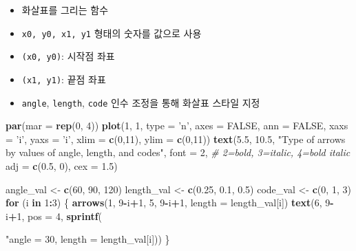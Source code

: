 \documentclass[
  11pt,
]{krantz}
\newenvironment{Shaded}{\begin{snugshade}}{\end{snugshade}}
\newcommand{\CommentTok}[1]{\textcolor[rgb]{0.37,0.37,0.37}{\textit{#1}}}
\newcommand{\ControlFlowTok}[1]{\textcolor[rgb]{0.27,0.27,0.27}{\textbf{#1}}}
\newcommand{\DataTypeTok}[1]{\textcolor[rgb]{0.27,0.27,0.27}{#1}}
\newcommand{\DecValTok}[1]{\textcolor[rgb]{0.06,0.06,0.06}{#1}}
\newcommand{\FloatTok}[1]{\textcolor[rgb]{0.06,0.06,0.06}{#1}}
\newcommand{\KeywordTok}[1]{\textcolor[rgb]{0.27,0.27,0.27}{\textbf{#1}}}
\newcommand{\NormalTok}[1]{#1}
\newcommand{\OperatorTok}[1]{\textcolor[rgb]{0.43,0.43,0.43}{\textbf{#1}}}
\newcommand{\OtherTok}[1]{\textcolor[rgb]{0.37,0.37,0.37}{#1}}
\newcommand{\StringTok}[1]{\textcolor[rgb]{0.5,0.5,0.5}{#1}}
\providecommand{\tightlist}{%
  \setlength{\itemsep}{0pt}\setlength{\parskip}{0pt}}
\begin{document}
\begin{itemize}
\tightlist
\item
  화살표를 그리는 함수
\item
  \texttt{x0,\ y0,\ x1,\ y1} 형태의 숫자를 값으로 사용
\item
  \texttt{(x0,\ y0)}: 시작점 좌표
\item
  \texttt{(x1,\ y1)}: 끝점 좌표
\item
  \texttt{angle}, \texttt{length}, \texttt{code} 인수 조정을 통해 화살표 스타일 지정
\end{itemize}

\footnotesize

\begin{Shaded}
\begin{Highlighting}[]
\KeywordTok{par}\NormalTok{(}\DataTypeTok{mar =} \KeywordTok{rep}\NormalTok{(}\DecValTok{0}\NormalTok{, }\DecValTok{4}\NormalTok{))}
\KeywordTok{plot}\NormalTok{(}\DecValTok{1}\NormalTok{, }\DecValTok{1}\NormalTok{,}
     \DataTypeTok{type =} \StringTok{'n'}\NormalTok{, }\DataTypeTok{axes =} \OtherTok{FALSE}\NormalTok{, }\DataTypeTok{ann =} \OtherTok{FALSE}\NormalTok{,}
     \DataTypeTok{xaxs =} \StringTok{'i'}\NormalTok{, }\DataTypeTok{yaxs =} \StringTok{'i'}\NormalTok{,}
     \DataTypeTok{xlim =} \KeywordTok{c}\NormalTok{(}\DecValTok{0}\NormalTok{,}\DecValTok{11}\NormalTok{), }\DataTypeTok{ylim =} \KeywordTok{c}\NormalTok{(}\DecValTok{0}\NormalTok{,}\DecValTok{11}\NormalTok{))}
\KeywordTok{text}\NormalTok{(}\FloatTok{5.5}\NormalTok{, }\FloatTok{10.5}\NormalTok{,}
     \StringTok{"Type of arrows by values of angle, length, and codes"}\NormalTok{,}
     \DataTypeTok{font =} \DecValTok{2}\NormalTok{, }\CommentTok{# 2=bold, 3=italic, 4=bold italic}
     \DataTypeTok{adj =} \KeywordTok{c}\NormalTok{(}\FloatTok{0.5}\NormalTok{, }\DecValTok{0}\NormalTok{),}
     \DataTypeTok{cex =} \FloatTok{1.5}\NormalTok{)}

\NormalTok{angle_val <-}\StringTok{ }\KeywordTok{c}\NormalTok{(}\DecValTok{60}\NormalTok{, }\DecValTok{90}\NormalTok{, }\DecValTok{120}\NormalTok{)}
\NormalTok{length_val <-}\StringTok{ }\KeywordTok{c}\NormalTok{(}\FloatTok{0.25}\NormalTok{, }\FloatTok{0.1}\NormalTok{, }\FloatTok{0.5}\NormalTok{)}
\NormalTok{code_val <-}\StringTok{ }\KeywordTok{c}\NormalTok{(}\DecValTok{0}\NormalTok{, }\DecValTok{1}\NormalTok{, }\DecValTok{3}\NormalTok{)}
\ControlFlowTok{for}\NormalTok{ (i }\ControlFlowTok{in} \DecValTok{1}\OperatorTok{:}\DecValTok{3}\NormalTok{) \{}
  \KeywordTok{arrows}\NormalTok{(}\DecValTok{1}\NormalTok{, }\DecValTok{9}\OperatorTok{-}\NormalTok{i}\OperatorTok{+}\DecValTok{1}\NormalTok{, }\DecValTok{5}\NormalTok{, }\DecValTok{9}\OperatorTok{-}\NormalTok{i}\OperatorTok{+}\DecValTok{1}\NormalTok{,}
         \DataTypeTok{length =}\NormalTok{ length_val[i])}
  \KeywordTok{text}\NormalTok{(}\DecValTok{6}\NormalTok{, }\DecValTok{9}\OperatorTok{-}\NormalTok{i}\OperatorTok{+}\DecValTok{1}\NormalTok{, }\DataTypeTok{pos =} \DecValTok{4}\NormalTok{,}
       \KeywordTok{sprintf}\NormalTok{(}\StringTok{"angle = 30, length = %
\NormalTok{               length_val[i]))}
\NormalTok{\}}

}
\end{Highlighting}
\end{Shaded}
\end{document}
